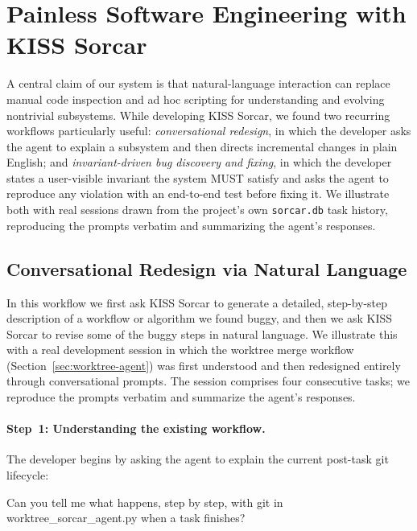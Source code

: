 \documentclass{article}
\begin{document}
\section{Painless Software Engineering with KISS Sorcar}
\label{sec:painless}

A central claim of our system is that natural-language interaction can replace manual code inspection and ad hoc scripting for understanding and evolving nontrivial subsystems.  While developing KISS Sorcar, we found two recurring workflows particularly useful: \emph{conversational redesign}, in which the developer asks the agent to explain a subsystem and then directs incremental changes in plain English; and \emph{invariant-driven bug discovery and fixing}, in which the developer states a user-visible invariant the system MUST satisfy and asks the agent to reproduce any violation with an end-to-end test before fixing it. We illustrate both with real sessions drawn from the project's own \texttt{sorcar.db} task history, reproducing the prompts verbatim and summarizing the agent's responses.

\subsection{Conversational Redesign via Natural Language}
\label{sec:painless-redesign}

In this workflow we first ask KISS Sorcar to generate a detailed, step-by-step description of a workflow or algorithm we found buggy, and then we ask KISS Sorcar to revise some of the buggy steps in natural language. We illustrate this with a real development session in which the worktree merge workflow (Section~\ref{sec:worktree-agent}) was first understood and then redesigned entirely through conversational prompts.  The session comprises four consecutive tasks; we reproduce the prompts verbatim and summarize the agent's responses.

\paragraph{Step~1: Understanding the existing workflow.} The developer begins by asking the agent to explain the current post-task git lifecycle:

\begin{prompt}
Can you tell me what happens, step by step, with git in worktree_sorcar_agent.py when a task finishes?
\end{prompt}
\end{document}
